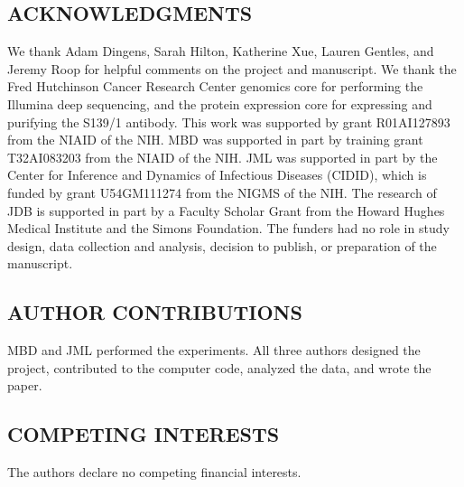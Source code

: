 \documentclass[11pt]{article}
\begin{document}
\subsection*{ACKNOWLEDGMENTS}
We thank Adam Dingens, Sarah Hilton, Katherine Xue, Lauren Gentles, and Jeremy Roop for helpful comments on the project and manuscript.
We thank the Fred Hutchinson Cancer Research Center genomics core for performing the Illumina deep sequencing, and the protein expression core for expressing and purifying the S139/1 antibody.
This work was supported by grant R01AI127893 from the NIAID of the NIH.
MBD was supported in part by training grant T32AI083203 from the NIAID of the NIH.
JML was supported in part by the Center for Inference and Dynamics of Infectious Diseases (CIDID), which is funded by grant U54GM111274 from the NIGMS of the NIH.
The research of JDB is supported in part by a Faculty Scholar Grant from the Howard Hughes Medical Institute and the Simons Foundation.
The funders had no role in study design, data collection and analysis, decision to publish, or preparation of the manuscript.

\subsection*{AUTHOR CONTRIBUTIONS}
MBD and JML performed the experiments.
All three authors designed the project, contributed to the computer code, analyzed the data, and wrote the paper.

\subsection*{COMPETING INTERESTS}
The authors declare no competing financial interests.
\end{document}
